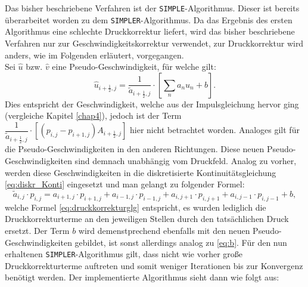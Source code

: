 Das bisher beschriebene Verfahren ist der \texttt{SIMPLE}-Algorithmus. Dieser ist bereits \"uberarbeitet worden zu dem \texttt{SIMPLER}-Algorithmus. Da das Ergebnis des ersten Algorithmus eine schlechte Druckkorrektur liefert, wird das bisher beschriebene Verfahren nur zur Geschwindigkeitskorrektur verwendet, zur Druckkorrektur wird anders, wie im Folgenden erl\"autert, vorgegangen. \\
Sei $\hat{u}$ bzw. $\hat{v}$ eine Pseudo-Geschwindigkeit, f\"ur welche gilt:
\begin{equation} \label{eq:pseudo_geschw}
\hat{u}_{i+\frac{1}{2},j}=\dfrac{1}{\tilde{a}_{i+\frac{1}{2},j}}\cdot\left[\sum\limits_{n}a_{n}u_{n}+b\right].
\end{equation}
Dies entspricht der Geschwindigkeit, welche aus der Impulsgleichung hervor ging (vergleiche Kapitel \ref{chap4}), jedoch ist der Term $\dfrac{1}{\tilde{a}_{i+\frac{1}{2},j}}\cdot\left[\left(p_{i,j}-p_{i+1,j}\right)A_{i+\frac{1}{2},j}\right]$ hier nicht betrachtet worden. Analoges gilt f\"ur die Pseudo-Geschwindigkeiten in den anderen Richtungen. Diese neuen Pseudo-Geschwindigkeiten sind demnach unabh\"angig vom Druckfeld. Analog zu vorher, werden diese Geschwindigkeiten in die diskretisierte Kontinuit\"atsgleichung \eqref{eq:diskr_Konti} eingesetzt und man gelangt zu folgender Formel:
\begin{equation} \label{eq:druckkorrekturglg_simpler}
\tilde{a}_{i,j}\cdot p_{i,j} = a_{i+1,j}\cdot p_{i+1,j}+a_{i-1,j}\cdot p_{i-1,j}+a_{i,j+1}\cdot p_{i,j+1}+a_{i,j-1}\cdot p_{i,j-1}+b,
\end{equation}
welche Formel \eqref{eq:druckkorrekturglg} entspricht, es wurden lediglich die Druckkorrekturterme an den jeweiligen Stellen durch den tats\"achlichen Druck ersetzt. Der Term $b$ wird demenstprechend ebenfalls mit den neuen Pseudo-Geschwindigkeiten gebildet, ist sonst allerdings analog zu \eqref{eq:b}. F\"ur den nun erhaltenen \texttt{SIMPLER}-Algorithmus gilt, dass nicht wie vorher gro\ss{}e Druckkorrekturterme auftreten und somit weniger Iterationen bis zur Konvergenz ben\"otigt werden. Der implementierte Algorithmus sieht dann wie folgt aus:
